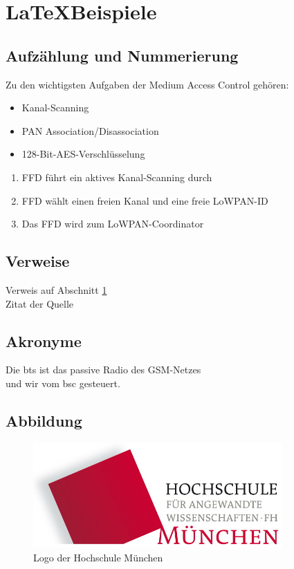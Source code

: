 \section{\LaTeX Beispiele}\label{sec:bsp}

\subsection{Aufzählung und Nummerierung}

Zu den wichtigsten Aufgaben der Medium Access Control gehören:
\begin{itemize}
  \item Kanal-Scanning
  \item PAN Association/Disassociation
  \item 128-Bit-AES-Verschlüsselung
\end{itemize}
\begin{enumerate}
  \item FFD führt ein aktives Kanal-Scanning durch
  \item FFD wählt einen freien Kanal und eine freie LoWPAN-ID
  \item Das FFD wird zum LoWPAN-Coordinator
\end{enumerate}

\subsection{Verweise}

Verweis auf Abschnitt \ref{sec:bsp} \\
Zitat der Quelle \cite{gk09}

\subsection{Akronyme}
Die \gls{bts} ist das passive Radio des GSM-Netzes \\
und wir vom \gls{bsc} gesteuert.

\subsection{Abbildung}

\begin{figure}[!ht]
  \centering
  \includegraphics[width=0.85\textwidth]{img/hm.jpg}
  \caption{Logo der Hochschule München}
  \label{fig:HS}
\end{figure}

